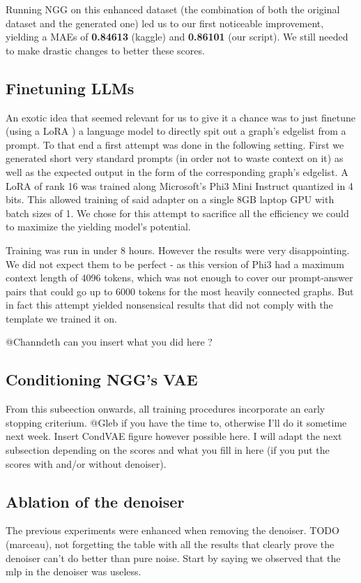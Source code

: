 \documentclass[10pt,twocolumn,letterpaper]{article}
\begin{document}
Running NGG on this enhanced dataset (the combination of both the original dataset and the generated one) led us to our first noticeable improvement, yielding a MAEs of \textbf{0.84613} (kaggle) and \textbf{0.86101} (our script). We still needed to make drastic changes to better these scores.

\subsection{Finetuning LLMs}
\label{subsec:LLMs}
An exotic idea that seemed relevant for us to give it a chance was to just finetune (using a LoRA \cite{lora}) a language model to directly spit out a graph's edgelist from a prompt. To that end a first attempt was done in the following setting. First we generated short very standard prompts (in order not to waste context on it) as well as the expected output in the form of the corresponding graph's edgelist. A LoRA of rank 16 was trained along Microsoft's Phi3 Mini Instruct quantized in 4 bits. This allowed training of said adapter on a single 8GB laptop GPU with batch sizes of 1. We chose for this attempt to sacrifice all the efficiency we could to maximize the yielding model's potential. 

\noindent
Training was run in under 8 hours. However the results were very disappointing. We did not expect them to be perfect - as this version of Phi3 had a maximum context length of 4096 tokens, which was not enough to cover our prompt-answer pairs that could go up to 6000 tokens for the most heavily connected graphs. But in fact this attempt yielded nonsensical results that did not comply with the template we trained it on.

@Channdeth can you insert what you did here ?


\subsection{Conditioning NGG's VAE}
\label{subsec:conditioning}
From this subeection onwards, all training procedures incorporate an early stopping criterium.
@Gleb if you have the time to, otherwise I'll do it sometime next week.
Insert CondVAE figure however possible here.
I will adapt the next subsection depending on the scores and what you fill in here (if you put the scores with and/or without denoiser).


\subsection{Ablation of the denoiser}
\label{subsec:ablation_denosier}
The previous experiments were enhanced when removing the denoiser. TODO (marceau), not forgetting the table with all the results that clearly prove the denoiser can't do better than pure noise. Start by saying we observed that the mlp in the denoiser was useless.
\end{document}
